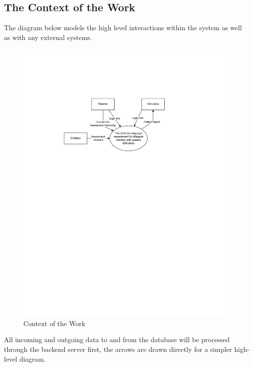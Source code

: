 \documentclass[12pt]{article}
\begin{document}
\subsection{The Context of the Work}
\hspace{2em}The diagram below models the high level interactions within the system as well as with any external systems.
\begin{figure}[H]
  \centering
  \includegraphics[page=1, trim=100 450 0 125, clip]{images/contextofthework.drawio.pdf}
  \caption{Context of the Work}
\end{figure}

All incoming and outgoing data to and from the database will be processed through the backend server first, the arrows are drawn directly for a simpler high-level diagram. 
\end{document}

